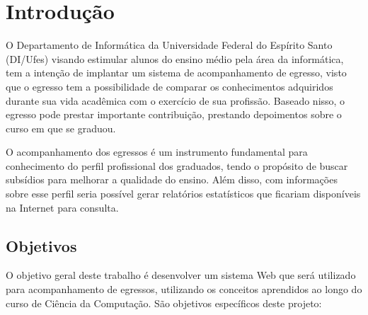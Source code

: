 

\chapter{Introdução}
\label{sec-intro}

O Departamento de Informática da Universidade Federal do Espírito Santo (DI/Ufes) visando estimular alunos do ensino médio pela área da informática, tem a intenção de implantar um sistema de acompanhamento de egresso, visto que o egresso tem a possibilidade de comparar os conhecimentos adquiridos durante sua vida acadêmica com o exercício de sua profissão. Baseado nisso, o egresso pode prestar importante contribuição, prestando depoimentos sobre o curso em que se graduou.


O acompanhamento dos egressos é um instrumento fundamental para conhecimento do perfil profissional dos graduados, tendo o propósito de buscar subsídios para melhorar a qualidade do ensino. Além disso, com informações sobre esse perfil seria possível gerar relatórios estatísticos que ficariam disponíveis na Internet para consulta.





\section{Objetivos}
\label{sec-intro-objetivos}

O objetivo geral deste trabalho é desenvolver um sistema Web que será utilizado para acompanhamento de egressos, utilizando os conceitos aprendidos ao longo do curso de Ciência da Computação. São objetivos específicos deste projeto:


